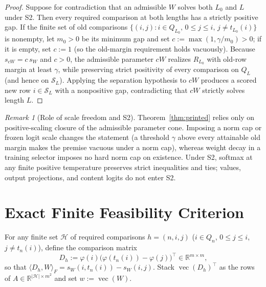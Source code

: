 \documentclass[11pt]{article}
\theoremstyle{plain}
\theoremstyle{definition}
\theoremstyle{remark}
\newtheorem{remark}{Remark}
\DeclareMathOperator{\vecop}{vec}
\begin{document}
\begin{proof}
Suppose for contradiction that an admissible $W$ solves both $L_0$ and $L$ under S2. Then every required comparison at both lengths has a strictly positive gap.
If the finite set of old comparisons $\{(i, j) : i \in Q_{L_0},\, 0 \le j \le i,\, j \neq t_{L_0}(i)\}$ is nonempty, let $m_0 > 0$ be its minimum gap and set $c := \max(1, \gamma / m_0) > 0$; if it is empty, set $c := 1$ (so the old-margin requirement holds vacuously).
Because $s_{cW} = c\,s_W$ and $c > 0$, the admissible parameter $cW$ realizes $R_{L_0}$ with old-row margin at least $\gamma$, while preserving strict positivity of every comparison on $Q_L$ (and hence on $\mathcal{S}_L$).
Applying the separation hypothesis to $cW$ produces a scored new row $i \in \mathcal{S}_L$ with a nonpositive gap, contradicting that $cW$ strictly solves length $L$.
\end{proof}

\begin{remark}[Role of scale freedom and S2]
Theorem~\ref{thm:printed} relies only on positive-scaling closure of the admissible parameter cone. Imposing a norm cap or frozen logit scale changes the statement (a threshold $\gamma$ above every attainable old margin makes the premise vacuous under a norm cap), whereas weight decay in a training selector imposes no hard norm cap on existence. Under S2, softmax at any finite positive temperature preserves strict inequalities and ties; values, output projections, and content logits do not enter S2.
\end{remark}

\section{Exact Finite Feasibility Criterion}

For any finite set $\mathcal{H}$ of required comparisons $h = (n, i, j)$ ($i \in Q_n$, $0 \le j \le i$, $j \neq t_n(i)$), define the comparison matrix
\[
D_h := \varphi(i)\bigl(\varphi(t_n(i)) - \varphi(j)\bigr)^\top \in \mathbb{R}^{m \times m},
\]
so that $\langle D_h, W \rangle_F = s_W(i, t_n(i)) - s_W(i, j)$. Stack $\vecop(D_h)^\top$ as the rows of $A \in \mathbb{R}^{|\mathcal{H}| \times m^2}$ and set $w := \vecop(W)$.
\end{document}
